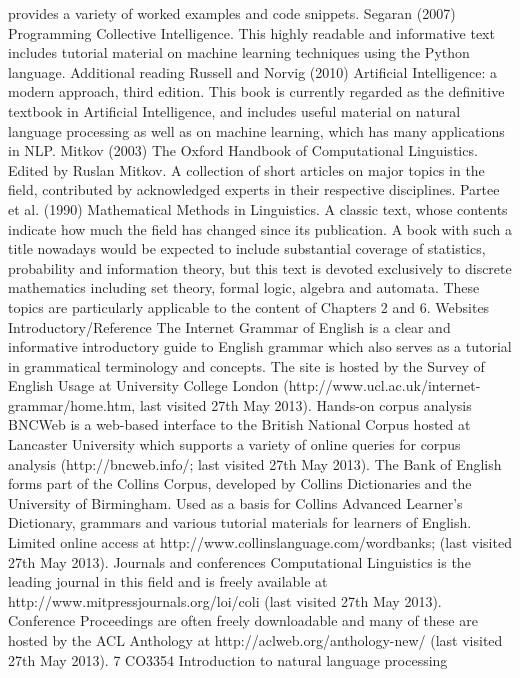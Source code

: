 provides a variety of worked examples and code snippets.
Segaran (2007) Programming Collective Intelligence. This highly readable and
informative text includes tutorial material on machine learning techniques using
the Python language.
Additional reading
Russell and Norvig (2010) Artificial Intelligence: a modern approach, third edition.
This book is currently regarded as the definitive textbook in Artificial
Intelligence, and includes useful material on natural language processing as well
as on machine learning, which has many applications in NLP.
Mitkov (2003) The Oxford Handbook of Computational Linguistics. Edited by Ruslan
Mitkov. A collection of short articles on major topics in the field, contributed by
acknowledged experts in their respective disciplines.
Partee et al. (1990) Mathematical Methods in Linguistics. A classic text, whose
contents indicate how much the field has changed since its publication. A book
with such a title nowadays would be expected to include substantial coverage of
statistics, probability and information theory, but this text is devoted exclusively
to discrete mathematics including set theory, formal logic, algebra and automata.
These topics are particularly applicable to the content of Chapters 2 and 6.
Websites
Introductory/Reference The Internet Grammar of English is a clear and informative
introductory guide to English grammar which also serves as a tutorial in
grammatical terminology and concepts. The site is hosted by the Survey of
English Usage at University College London
(http://www.ucl.ac.uk/internet-grammar/home.htm, last visited 27th May
2013).
Hands-on corpus analysis
BNCWeb is a web-based interface to the British National Corpus hosted at Lancaster
University which supports a variety of online queries for corpus analysis
(http://bncweb.info/; last visited 27th May 2013).
The Bank of English forms part of the Collins Corpus, developed by Collins
Dictionaries and the University of Birmingham. Used as a basis for Collins
Advanced Learner’s Dictionary, grammars and various tutorial materials for
learners of English. Limited online access at
http://www.collinslanguage.com/wordbanks; (last visited 27th May 2013).
Journals and conferences
Computational Linguistics is the leading journal in this field and is freely available at
http://www.mitpressjournals.org/loi/coli (last visited 27th May 2013).
Conference Proceedings are often freely downloadable and many of these are
hosted by the ACL Anthology at http://aclweb.org/anthology-new/ (last visited
27th May 2013).
7
CO3354 Introduction to natural language processing
